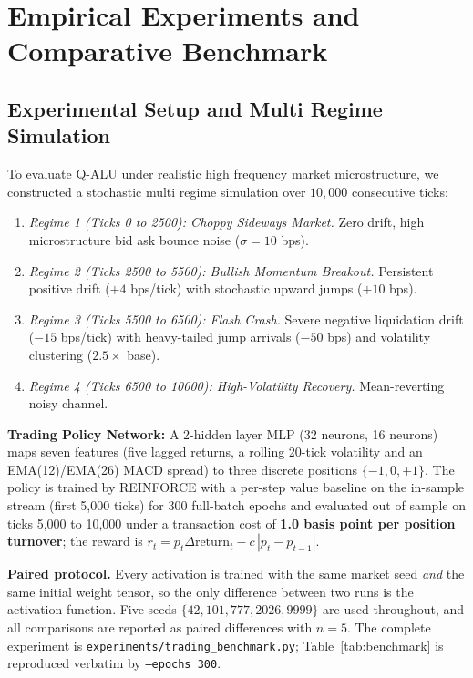 \documentclass[conference]{IEEEtran}
\begin{document}
\section{Empirical Experiments and Comparative Benchmark}
\label{sec:benchmark}
\subsection{Experimental Setup and Multi Regime Simulation}
To evaluate Q-ALU under realistic high frequency market microstructure, we constructed a stochastic multi regime simulation over $10,000$ consecutive ticks:
\begin{enumerate}
    \item \textit{Regime 1 (Ticks 0 to 2500): Choppy Sideways Market.} Zero drift, high microstructure bid ask bounce noise ($\sigma = 10$ bps).
    \item \textit{Regime 2 (Ticks 2500 to 5500): Bullish Momentum Breakout.} Persistent positive drift ($+4$ bps/tick) with stochastic upward jumps ($+10$ bps).
    \item \textit{Regime 3 (Ticks 5500 to 6500): Flash Crash.} Severe negative liquidation drift ($-15$ bps/tick) with heavy-tailed jump arrivals ($-50$ bps) and volatility clustering ($2.5\times$ base).
    \item \textit{Regime 4 (Ticks 6500 to 10000): High-Volatility Recovery.} Mean-reverting noisy channel.
\end{enumerate}

\textbf{Trading Policy Network:} A 2-hidden layer MLP (32 neurons, 16 neurons) maps seven features (five lagged returns, a rolling 20-tick volatility and an EMA(12)/EMA(26) MACD spread) to three discrete positions $\{-1, 0, +1\}$. The policy is trained by REINFORCE with a per-step value baseline on the in-sample stream (first 5,000 ticks) for 300 full-batch epochs and evaluated out of sample on ticks 5,000 to 10,000 under a transaction cost of \textbf{1.0 basis point per position turnover}; the reward is $r_t = p_t \Delta \text{return}_t - c\,|p_t - p_{t-1}|$.

\textbf{Paired protocol.} Every activation is trained with the same market seed \emph{and} the same initial weight tensor, so the only difference between two runs is the activation function. Five seeds $\{42, 101, 777, 2026, 9999\}$ are used throughout, and all comparisons are reported as paired differences with $n = 5$. The complete experiment is \texttt{experiments/trading\_benchmark.py}; Table~\ref{tab:benchmark} is reproduced verbatim by \texttt{--epochs 300}.
\end{document}
